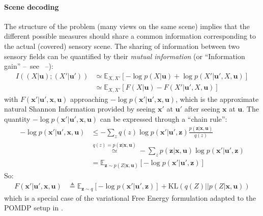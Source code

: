 \documentclass[12pt,twoside,openright]{article}
\begin{document}
\paragraph{Scene decoding}
The structure of the problem (many views on the same scene) implies that the different possible measures should share a common information corresponding to the actual (covered) sensory scene. The sharing of information between two sensory fields can be quantified by their \emph{mutual information} (or ``Information gain'' --~see \cite{tishby2011information}~--):
\begin{align}
I((X| \boldsymbol{u}); (X'| \boldsymbol{u}')) &\simeq \mathbb{E}_{X,X'} \left[-\log p(X| \boldsymbol{u}) + \log p(X'| \boldsymbol{u}', X, \boldsymbol{u})\right] \nonumber\\
&\simeq \mathbb{E}_{X,X'} \left[F(X|\boldsymbol{u}) - F(X'|\boldsymbol{u}', X, \boldsymbol{u})\right] 
\end{align}
with $F(\boldsymbol{x}'|\boldsymbol{u}', \boldsymbol{x}, \boldsymbol{u})$ approaching  $-\log p(\boldsymbol{x}'| \boldsymbol{u}', \boldsymbol{x}, \boldsymbol{u})$, which is the approximate natural Shannon Information provided by seeing $\boldsymbol{x}'$ at $\boldsymbol{u}'$ after seeing $\boldsymbol{x}$ at $\boldsymbol{u}$. The quantity $-\log p(\boldsymbol{x}'| \boldsymbol{u}', \boldsymbol{x}, \boldsymbol{u})$ can be expressed through a ``chain rule'': 
\begin{align}
-\log p(\boldsymbol{x}'| \boldsymbol{u}', \boldsymbol{x}, \boldsymbol{u}) 
&\leq - \sum_z q(z) \log p(\boldsymbol{x}'| \boldsymbol{u}', \boldsymbol{z}) \frac{p(\boldsymbol{z} |\boldsymbol{x}, \boldsymbol{u})} {q(z)}  \nonumber\\
&\stackrel{q(z) = p(\boldsymbol{z} |\boldsymbol{x}, \boldsymbol{u})}{\simeq} 
- \sum_z p(\boldsymbol{z} |\boldsymbol{x}, \boldsymbol{u}) \log p(\boldsymbol{x}'| \boldsymbol{u}', \boldsymbol{z})  \nonumber\\
&= \mathbb{E}_{\boldsymbol{z} \sim p(Z |\boldsymbol{x}, \boldsymbol{u})} \left[-\log p(\boldsymbol{x}'| \boldsymbol{u}', \boldsymbol{z})\right] 
\end{align}
So:
\begin{align}
F(\boldsymbol{x}'|\boldsymbol{u}', \boldsymbol{x}, \boldsymbol{u}) 
&\triangleq \mathbb{E}_{\boldsymbol{z} \sim q} \left[-\log p(\boldsymbol{x}'| \boldsymbol{u}', \boldsymbol{z})\right] + \text{KL}(q(Z)||p(Z|\boldsymbol{x},\boldsymbol{u}))
\label{eq:FEP-uxu}
\end{align}
which is a special case of the variational Free Energy formulation adapted to the POMDP setup in \cite{friston2015active}.
\end{document}
